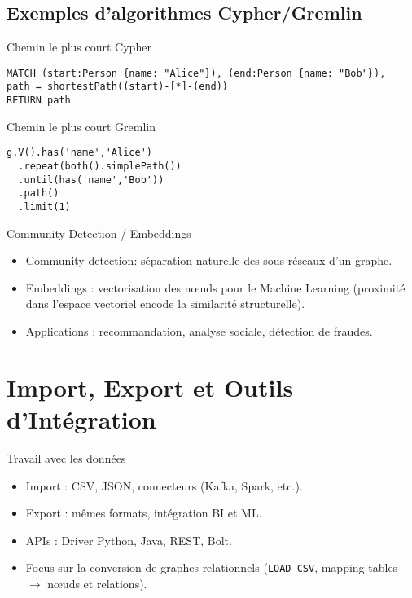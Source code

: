\documentclass{beamer}
\begin{document}
\subsection{Exemples d’algorithmes Cypher/Gremlin}
\begin{frame}[fragile]{Chemin le plus court Cypher}
\begin{lstlisting}
MATCH (start:Person {name: "Alice"}), (end:Person {name: "Bob"}),
path = shortestPath((start)-[*]-(end))
RETURN path
\end{lstlisting}
\end{frame}

\begin{frame}[fragile]{Chemin le plus court Gremlin}
\begin{lstlisting}
g.V().has('name','Alice')
  .repeat(both().simplePath())
  .until(has('name','Bob'))
  .path()
  .limit(1)
\end{lstlisting}
\end{frame}

\begin{frame}{Community Detection / Embeddings}
  \begin{itemize}
    \item Community detection: séparation naturelle des sous-réseaux d’un graphe.
    \item Embeddings : vectorisation des nœuds pour le Machine Learning (proximité dans l’espace vectoriel encode la similarité structurelle).
    \item Applications : recommandation, analyse sociale, détection de fraudes.
  \end{itemize}
\end{frame}

\section{Import, Export et Outils d’Intégration}
\begin{frame}{Travail avec les données}
  \begin{itemize}
    \item Import : CSV, JSON, connecteurs (Kafka, Spark, etc.).
    \item Export : mêmes formats, intégration BI et ML.
    \item APIs : Driver Python, Java, REST, Bolt.
    \item Focus sur la conversion de graphes relationnels (\texttt{LOAD CSV}, mapping tables $\to$ nœuds et relations).
  \end{itemize}
\end{frame}
\end{document}

